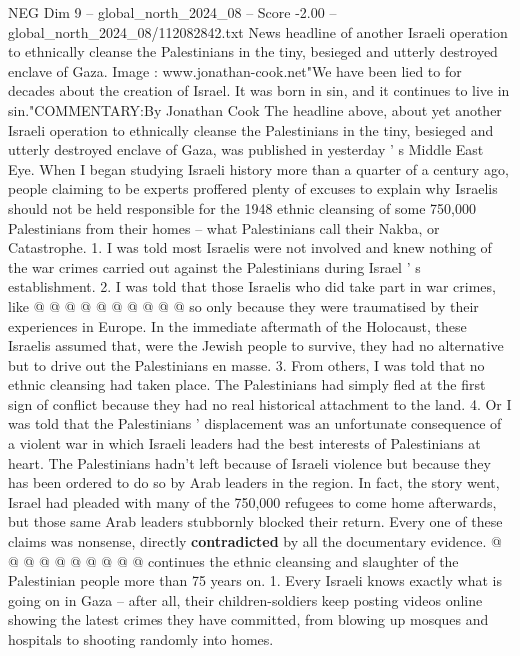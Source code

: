 \begin{textsample}{NEG Dim 9 – global\_north\_2024\_08 – Score -2.00 – global\_north\_2024\_08/112082842.txt}  \label{ex:f9_neg_256}
News headline of another Israeli operation to ethnically cleanse the Palestinians in the tiny, besieged and utterly destroyed enclave of Gaza.
Image : www.jonathan-cook.net"We have been lied to for decades about the creation of Israel.
It was born in sin, and it continues to live in sin."COMMENTARY:By Jonathan Cook The headline above, about yet another Israeli operation to ethnically cleanse the Palestinians in the tiny, besieged and utterly destroyed enclave of Gaza, was published in yesterday ' s Middle East Eye.
When I began studying Israeli history more than a quarter of a century ago, people claiming to be experts proffered plenty of excuses to explain why Israelis should not be held responsible for the 1948 ethnic cleansing of some 750,000 Palestinians from their homes -- what Palestinians call their Nakba, or Catastrophe. 1.
I was told most Israelis were not involved and knew nothing of the war crimes carried out against the Palestinians during Israel ' s establishment. 2.
I was told that those Israelis who did take part in war crimes, like @ @ @ @ @ @ @ @ @ @ so only because they were traumatised by their experiences in Europe.
In the immediate aftermath of the Holocaust, these Israelis assumed that, were the Jewish people to survive, they had no alternative but to drive out the Palestinians en masse. 3.
From others, I was told that no ethnic cleansing had taken place.
The Palestinians had simply fled at the first sign of conflict because they had no real historical attachment to the land. 4.
Or I was told that the Palestinians ' displacement was an unfortunate consequence of a violent war in which Israeli leaders had the best interests of Palestinians at heart.
The Palestinians hadn't left because of Israeli violence but because they has been ordered to do so by Arab leaders in the region.
In fact, the story went, Israel had pleaded with many of the 750,000 refugees to come home afterwards, but those same Arab leaders stubbornly blocked their return.
Every one of these claims was nonsense, directly \textbf{contradicted} by all the documentary evidence. @ @ @ @ @ @ @ @ @ @ continues the ethnic cleansing and slaughter of the Palestinian people more than 75 years on. 1.
Every Israeli knows exactly what is going on in Gaza -- after all, their children-soldiers keep posting videos online showing the latest crimes they have committed, from blowing up mosques and hospitals to shooting randomly into homes.

\end{textsample}
